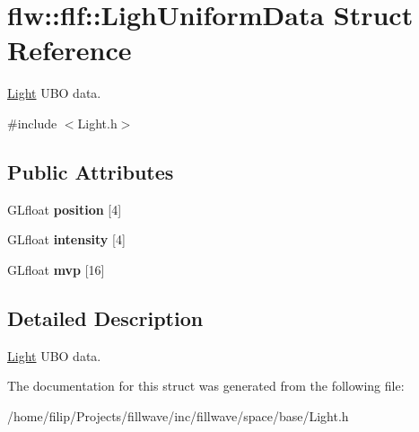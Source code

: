 \hypertarget{structflw_1_1flf_1_1LighUniformData}{}\section{flw\+:\+:flf\+:\+:Ligh\+Uniform\+Data Struct Reference}
\label{structflw_1_1flf_1_1LighUniformData}


\hyperlink{classflw_1_1flf_1_1Light}{Light} U\+BO data.  




{\ttfamily \#include $<$Light.\+h$>$}

\subsection*{Public Attributes}
\begin{DoxyCompactItemize}
\item 
G\+Lfloat {\bfseries position} \mbox{[}4\mbox{]}\hypertarget{structflw_1_1flf_1_1LighUniformData_a0e24770ef4654e1958bb998b1357fec9}{}\label{structflw_1_1flf_1_1LighUniformData_a0e24770ef4654e1958bb998b1357fec9}

\item 
G\+Lfloat {\bfseries intensity} \mbox{[}4\mbox{]}\hypertarget{structflw_1_1flf_1_1LighUniformData_ae25d583436db813a6e006c99da7cb4e2}{}\label{structflw_1_1flf_1_1LighUniformData_ae25d583436db813a6e006c99da7cb4e2}

\item 
G\+Lfloat {\bfseries mvp} \mbox{[}16\mbox{]}\hypertarget{structflw_1_1flf_1_1LighUniformData_a61bc7a687ba50d3474faff5d02992754}{}\label{structflw_1_1flf_1_1LighUniformData_a61bc7a687ba50d3474faff5d02992754}

\end{DoxyCompactItemize}


\subsection{Detailed Description}
\hyperlink{classflw_1_1flf_1_1Light}{Light} U\+BO data. 

The documentation for this struct was generated from the following file\+:\begin{DoxyCompactItemize}
\item 
/home/filip/\+Projects/fillwave/inc/fillwave/space/base/Light.\+h\end{DoxyCompactItemize}
